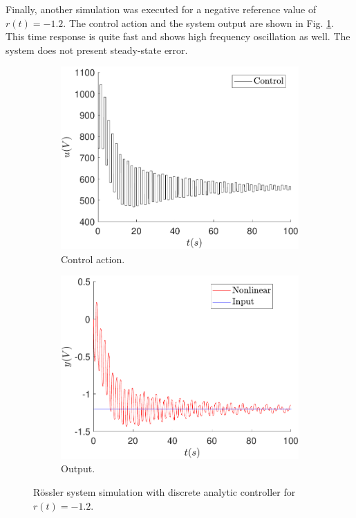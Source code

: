 	Finally, another simulation was executed for a negative reference value of $r(t)=-1.2$. The control action and the system output are shown in Fig. \ref{fig:anal_u_-1_2}. This time response is quite fast and shows high frequency oscillation as well. The system does not present steady-state error.
	\begin{figure}
        \centering
        \begin{subfigure}[b]{0.475\textwidth}
            \centering
            \includegraphics[scale=0.425]{files/heuristic/analytic/control_analytic_u_-1_2.pdf}
            \caption{Control action.}
        \end{subfigure}
        \vskip0.1cm
        \begin{subfigure}[b]{0.475\textwidth}   
            \centering 
            \includegraphics[scale=0.425]{files/heuristic/analytic/analytic_u_-1_2.pdf}
            \caption{Output.}
        \end{subfigure}
        \caption{Rössler system simulation with discrete analytic controller for $r(t)=-1.2$.}
        \label{fig:anal_u_-1_2}
	\end{figure}
	
